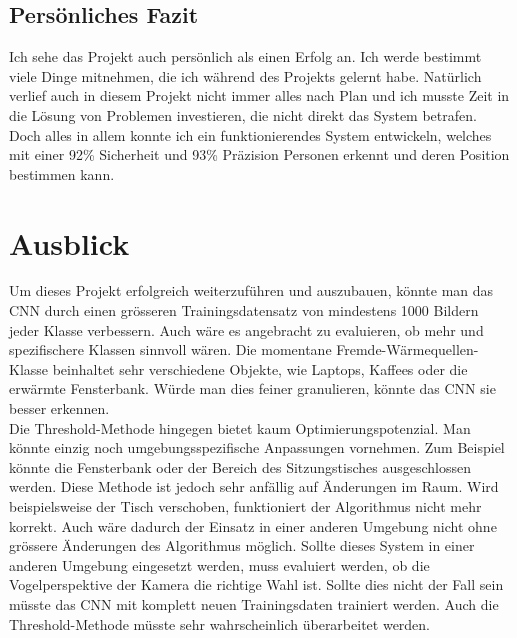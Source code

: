 \subsection{Persönliches Fazit}

Ich sehe das Projekt auch persönlich als einen Erfolg an. Ich werde bestimmt viele Dinge mitnehmen, die ich während des Projekts gelernt habe. Natürlich verlief auch in diesem Projekt nicht immer alles nach Plan und ich musste Zeit in die Lösung von Problemen investieren, die nicht direkt das System betrafen. Doch alles in allem konnte ich ein funktionierendes System entwickeln, welches mit einer 92\% Sicherheit und 93\% Präzision Personen erkennt und deren Position bestimmen kann.

\section{Ausblick}
Um dieses Projekt erfolgreich weiterzuführen und auszubauen, könnte man das \gls{CNN} durch einen grösseren Trainingsdatensatz von mindestens 1000 Bildern jeder Klasse verbessern. Auch wäre es angebracht zu evaluieren, ob mehr und spezifischere Klassen sinnvoll wären. Die momentane Fremde-Wärmequellen-Klasse beinhaltet sehr verschiedene Objekte, wie Laptops, Kaffees oder die erwärmte Fensterbank. Würde man dies feiner granulieren, könnte das \gls{CNN} sie besser erkennen.\\
Die Threshold-Methode hingegen bietet kaum Optimierungspotenzial. Man könnte einzig noch umgebungsspezifische Anpassungen vornehmen. Zum Beispiel könnte die Fensterbank oder der Bereich des Sitzungstisches ausgeschlossen werden. Diese Methode ist jedoch sehr anfällig auf Änderungen im Raum. Wird beispielsweise der Tisch verschoben, funktioniert der Algorithmus nicht mehr korrekt. Auch wäre dadurch der Einsatz in einer anderen Umgebung nicht ohne grössere Änderungen des Algorithmus möglich. Sollte dieses System in einer anderen Umgebung eingesetzt werden, muss evaluiert werden, ob die Vogelperspektive der Kamera die richtige Wahl ist. Sollte dies nicht der Fall sein müsste das CNN mit komplett neuen Trainingsdaten trainiert werden. Auch die Threshold-Methode müsste sehr wahrscheinlich überarbeitet werden.
